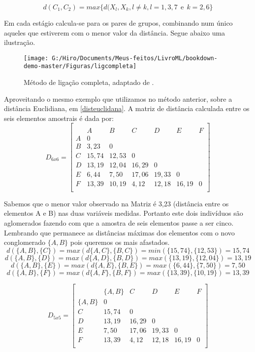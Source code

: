 \documentclass[
  openany]{book}
\begin{document}
\begin{equation}
d(C_1,C_2)=max \{d(X_l,X_k, l\neq k,l=1,3,7 \ \ \mbox{e} \ \ k=2,6\}
 \label{eq:ligcompleta}
\end{equation}

Em cada estágio calcula-se para os pares de grupos, combinando num único aqueles que estiverem com o menor valor da distância. Segue abaixo uma ilustração.

\begin{figure}

{\centering \texttt{[image: G:/Hiro/Documents/Meus-feitos/LivroML/bookdown-demo-master/Figuras/ligcompleta]} 

}

\caption{Método de ligação completa, adaptado de \citet{mingoti2007analise}.}\label{fig:ligcompleta}
\end{figure}



Aproveitando o mesmo exemplo que utilizamos no método anterior, sobre a distância Euclidiana, em \ref{disteuclidana}. A matriz de distância calculada entre os seis elementos amostrais é dada por:
\[D_{6x6}=\begin{bmatrix}\\
 &A&B&C&D&E&F \\
 A&0&&&&&\\
 B&3,23&0&&&&\\
 C & 15,74& 12,53&0&&&\\
 D& 13,19& 12,04& 16,29&0&&\\
 E& 6,44& 7,50& 17,06& 19,33&0&\\
 F& 13,39& 10,19& 4,12& 12,18& 16,19&0 \\
\end{bmatrix}\]

Sabemos que o menor valor observado na Matriz é 3,23 (distância entre os elementos A e B) nas duas variáveis medidas. Portanto este dois indivíduos são aglomerados fazendo com que a amostra de seis elementos passe a ser cinco. Lembrando que permanece as distâncias máximas dos elementos com o novo conglomerado \(\{A,B\}\) pois queremos os mais afastados.
\[d(\{A,B\},\{C\})=max(d\{A,C\},\{B,C\})=min(\{15,74\},\{12,53\})=15,74\]
\[d(\{A,B\},\{D\})=max(d\{A,D\},\{B,D\})=max(\{13,19\},\{12,04\})=13,19\]
\[d(\{A,B\},\{E\})=max(d\{A,E\},\{B,E\})=max(\{6,44\},\{7,50\})=7,50\]
\[d(\{A,B\},\{F\})=max(d\{A,F\},\{B,F\})=max(\{13,39\},\{10,19\})=13,39\]

\[D_{5x5}=\begin{bmatrix}\\
 &\{A,B\}&C&D&E&F \\
 \{A,B\}&0&&&&\\
 C & 15,74&0&&&\\
 D& 13,19& 16,29&0&&\\
 E& 7,50& 17,06& 19,33&0&\\
 F& 13,39& 4,12& 12,18& 16,19&0 \\
\end{bmatrix}\]
\end{document}
